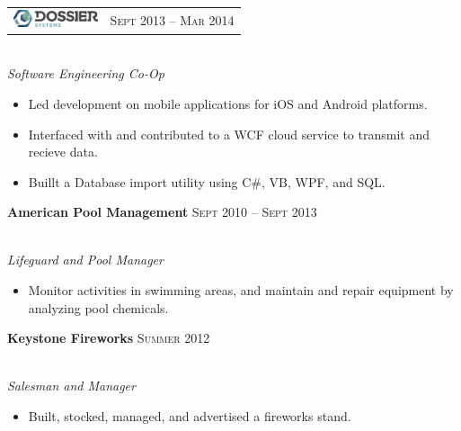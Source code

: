\documentclass[10pt]{article}
\begin{document}
{\begin{minipage}[t]{0.5\textwidth}

\begin{tabular}{ L{5cm} R{3.5cm} }
\includegraphics[height=0.5cm]{dossier} & 
{\raggedleft\textsc{Sept 2013 -- Mar 2014}} \\
\end{tabular}
{\raggedright\large\\
\textit{Software Engineering Co-Op}\\[5pt]}



\begin{itemize}
  \setlength\itemsep{0.4mm}
  \item[\ding{226}] Led development on mobile applications for iOS and Android platforms.
  \item[\ding{226}] Interfaced with and contributed to a WCF cloud service to transmit and recieve data.
  \item[\ding{226}] Buillt a Database import utility using C\#, VB, WPF, and SQL.
\end{itemize}

\textbf{American Pool Management} \hfill \textsc{Sept 2010 -- Sept 2013}
{\raggedright\large\\
\textit{Lifeguard and Pool Manager}\\[5pt]}
\vspace{-0.5 cm}
\begin{itemize}
  \item[\ding{226}] Monitor activities in swimming areas, and maintain and repair equipment by analyzing pool chemicals.
\end{itemize}

\textbf{Keystone Fireworks} \hfill \textsc{Summer 2012}
{\raggedright\large\\
\textit{Salesman and Manager}\\[5pt]}
\vspace{-0.5 cm}
\begin{itemize}
  \setlength\itemsep{0em}
  \item[\ding{226}] Built, stocked, managed, and advertised a fireworks stand.
\end{itemize}


\end{minipage}}
\end{document}
